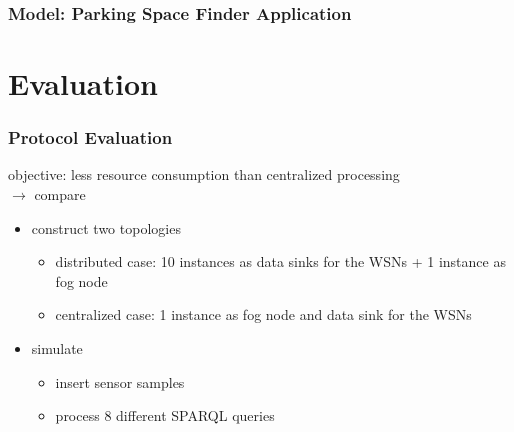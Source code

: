 \documentclass[english,10pt,xcolor=colortbl,compress]{beamer}
\begin{document}
\begin{frame}
	\frametitle{Model: Parking Space Finder Application}
    \begin{figure}
        \centering
	\end{figure}
\end{frame}

\section{Evaluation}

\begin{frame}
	\frametitle{Protocol Evaluation}
    objective: less resource consumption than centralized processing \\
    $\rightarrow$ compare
    \medskip
    \begin{itemize}
        \item construct two topologies
        \begin{itemize}
         \item distributed case: 10 instances as data sinks for the WSNs + 1 instance as fog node
         \item centralized case: 1 instance as fog node and data sink for the WSNs
        \end{itemize}
        \medskip
        \item simulate
        \begin{itemize}
            \item insert sensor samples
            \item process 8 different SPARQL queries
        \end{itemize}
    \end{itemize}
\end{frame}
\end{document}

